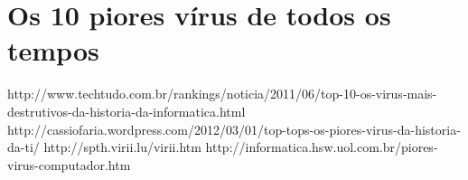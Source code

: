 \chapter{Os 10 piores vírus de todos os tempos}

http://www.techtudo.com.br/rankings/noticia/2011/06/top-10-os-virus-mais-destrutivos-da-historia-da-informatica.html
http://cassiofaria.wordpress.com/2012/03/01/top-tops-os-piores-virus-da-historia-da-ti/
http://spth.virii.lu/virii.htm
http://informatica.hsw.uol.com.br/piores-virus-computador.htm
